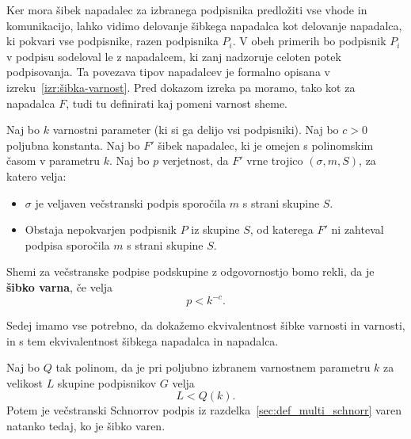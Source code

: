\documentclass[isrm2, tisk]{fmfdelo}
\begin{document}
Ker mora šibek napadalec za izbranega podpisnika predložiti vse vhode in komunikacijo, lahko vidimo
delovanje šibkega napadalca kot delovanje napadalca, ki pokvari vse podpisnike, razen podpisnika $P_i$.
V obeh primerih bo podpisnik $P_i$ v podpisu sodeloval le z napadalcem, ki zanj nadzoruje celoten
potek podpisovanja. Ta povezava tipov napadalcev je formalno opisana v izreku~\ref{izr:šibka-varnost}.
Pred dokazom izreka pa moramo, tako kot za napadalca $F$, tudi tu definirati kaj pomeni varnost sheme.

\begin{definicija}
    Naj bo $k$ varnostni parameter (ki si ga delijo vsi podpisniki). Naj bo $c > 0$ poljubna konstanta. 
    Naj bo $F'$ šibek napadalec, ki je omejen s polinomskim časom v parametru $k$. Naj bo $p$ 
    verjetnost, da $F'$ vrne trojico $(\sigma, m, S)$, za katero velja: 
    \begin{itemize}
        \item $\sigma$ je veljaven večstranski podpis sporočila $m$ s strani skupine $S$.
        \item Obstaja nepokvarjen podpisnik $P$ iz skupine $S$, od katerega $F'$ ni zahteval podpisa 
            sporočila $m$ s strani skupine $S$.
    \end{itemize}
    Shemi za večstranske 
    podpise podskupine z odgovornostjo bomo rekli, da je \textbf{šibko varna}, če velja 
    $$ 
    p < k^{-c}.
    $$
\end{definicija}

Sedej imamo vse potrebno, da dokažemo ekvivalentnost šibke varnosti in varnosti, in s tem
ekvivalentnost šibkega napadalca in napadalca.

\begin{izrek}
\label{izr:šibka-varnost}
    Naj bo $Q$ tak polinom, da je pri poljubno izbranem varnostnem parametru $k$ za velikost $L$ 
    skupine podpisnikov $G$ velja
    $$
    L < Q(k).
    $$
    Potem je večstranski Schnorrov podpis iz razdelka~\ref{sec:def_multi_schnorr} varen natanko
    tedaj, ko je šibko varen.
\end{izrek}
\end{document}
